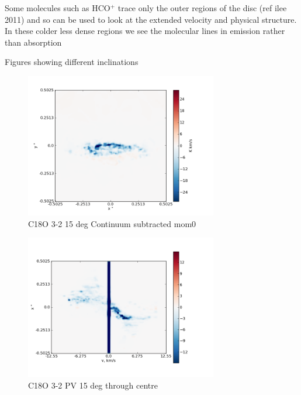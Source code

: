\documentclass[useAMS,usenatbib]{mn2e}
\begin{document}
Some molecules such as HCO$^+$ trace only the outer regions of the disc (ref ilee 2011) and so can be used to look at the extended velocity and physical structure. In these colder less dense regions we see the molecular lines in emission rather than absorption \newline
\newline \newline


Figures showing different inclinations  
\begin{figure}
 \includegraphics[width=84mm]{Figures/sim/imageC18O_3-2_15deg_contSub.png}

 \caption{C18O 3-2 15 deg Continuum subtracted mom0}
\end{figure}

%

\begin{figure}
 \includegraphics[width=84mm]{Figures/sim/imageC18O_3-2_15deg_PV_centre.png}

 \caption{C18O 3-2 PV 15 deg through centre}
\end{figure}
\end{document}
